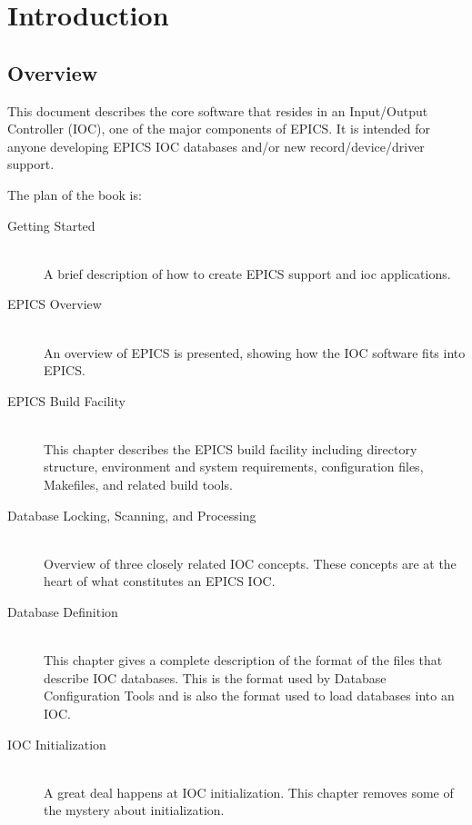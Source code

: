 \chapter{Introduction}

\section{Overview}

This document describes the core software that resides in an Input/Output Controller (IOC), one of the major components 
of EPICS. It is intended for anyone developing EPICS IOC databases and/or new record/device/driver support.

The plan of the book is:

\begin{description}

\item[Getting Started] \hfill \\
A brief description of how to create EPICS support and ioc applications.

\item[EPICS Overview] \hfill \\
An overview of EPICS is presented, showing how the IOC software fits into EPICS.

\item[EPICS Build Facility] \hfill \\
This chapter describes the EPICS build facility including directory
structure, environment and system requirements, configuration files, Makefiles, and related build tools.

\item[Database Locking, Scanning, and Processing] \hfill \\
Overview of three closely related IOC concepts. These concepts are at the heart of what constitutes an EPICS IOC.

\item[Database Definition] \hfill \\
This chapter gives a complete description of the format of the files that describe IOC databases. This is the format
used by Database Configuration Tools and is also the format used to load databases into an IOC.

\item[IOC Initialization] \hfill \\
A great deal happens at IOC initialization. This chapter removes some of the mystery about initialization.


\end{description}
